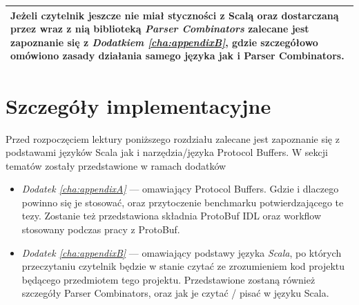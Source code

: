\documentclass[pdflatex,11pt]{aghdpl}
\begin{document}
\begin{center}
\begin{tabular}{ | p{\textwidth} | }
  \hline 
  Jeżeli czytelnik jeszcze nie miał styczności z Scalą oraz dostarczaną przez wraz z nią biblioteką 
  \textit{Parser Combinators} zalecane jest zapoznanie się z \textit{Dodatkiem \ref{cha:appendixB}}, 
  gdzie szczegółowo omówiono zasady działania samego języka jak i Parser Combinators. \\
  \hline 
\end{tabular}
\end{center}


% 
% 
% 
% 

\chapter{Szczegóły implementacyjne}
\label{sec:zastosowanePodejscie}

Przed rozpoczęciem lektury poniższego rozdziału zalecane jest zapoznanie się z podstawami języków Scala jak i narzędzia/języka Protocol Buffers. 
W sekcji tematów zostały przedstawione w ramach dodatków 
\begin{itemize}
 \item \textit{Dodatek \ref{cha:appendixA}} --- omawiający Protocol Buffers. Gdzie i dlaczego powinno się je stosować, oraz przytoczenie benchmarku potwierdzającego te tezy.
                                                Zostanie też przedstawiona składnia ProtoBuf IDL oraz workflow stosowany podczas pracy z ProtoBuf.
 \item \textit{Dodatek \ref{cha:appendixB}} --- omawiający podstawy języka \textit{Scala}, po których przeczytaniu czytelnik będzie w stanie czytać ze zrozumieniem kod
                                                projektu będącego przedmiotem tego projektu. Przedstawione zostaną również szczegóły Parser Combinators, oraz jak je czytać / pisać w języku Scala.
\end{itemize}
\end{document}
